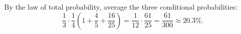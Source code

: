 By the law of total probability, average the three conditional probabilities:
\[\dfrac13\cdot\dfrac14\left(1+\dfrac45+\dfrac{16}{25}\right)=\dfrac1{12}\cdot\dfrac{61}{25}=\boxed{\dfrac{61}{300}}\approx20.3\%.\]
